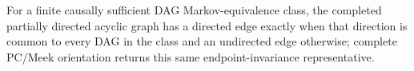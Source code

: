For a finite causally sufficient DAG Markov-equivalence class, the completed partially directed acyclic graph has a directed edge exactly when that direction is common to every DAG in the class and an undirected edge otherwise; complete PC/Meek orientation returns this same endpoint-invariance representative.